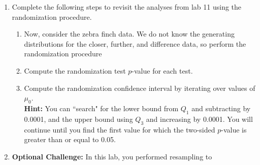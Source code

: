 \documentclass{article}\usepackage[]{graphicx}\usepackage[]{xcolor}
\makeatletter
\newcommand{\hlnum}[1]{\textcolor[rgb]{0.686,0.059,0.569}{#1}}%
\newcommand{\hlopt}[1]{\textcolor[rgb]{0,0,0}{#1}}%
\newcommand{\hldef}[1]{\textcolor[rgb]{0.345,0.345,0.345}{#1}}%
\newenvironment{kframe}{%
 \def\at@end@of@kframe{}%
 \ifinner\ifhmode%
  \def\at@end@of@kframe{\end{minipage}}%
  \begin{minipage}{\columnwidth}%
 \fi\fi%
 \def\FrameCommand##1{\hskip\@totalleftmargin \hskip-\fboxsep
 \colorbox{shadecolor}{##1}\hskip-\fboxsep
     \hskip-\linewidth \hskip-\@totalleftmargin \hskip\columnwidth}%
 \MakeFramed {\advance\hsize-\width
   \@totalleftmargin\z@ \linewidth\hsize
   \@setminipage}}%
 {\par\unskip\endMakeFramed%
 \at@end@of@kframe}
\newenvironment{knitrout}{}{} %
\makeatother
\begin{document}
\begin{enumerate}
\item Complete the following steps to revisit the analyses from lab 11 using the
randomization procedure.
\begin{enumerate}
\item Now, consider the zebra finch data. We do not know the generating distributions
for the closer, further, and difference data, so perform the randomization procedure
  \item Compute the randomization test $p$-value for each test.
  \item Compute the randomization confidence interval by iterating over values of $\mu_0$.\\
  \textbf{Hint:} You can ``search" for the lower bound from $Q_1$ and subtracting by 0.0001, 
  and the upper bound using $Q_3$ and increasing by 0.0001. You will continue until you find 
  the first value for which the two-sided $p$-value is greater than or equal to 0.05.
\end{enumerate}
\item \textbf{Optional Challenge:} In this lab, you performed resampling to 

\end{enumerate}
\end{document}
